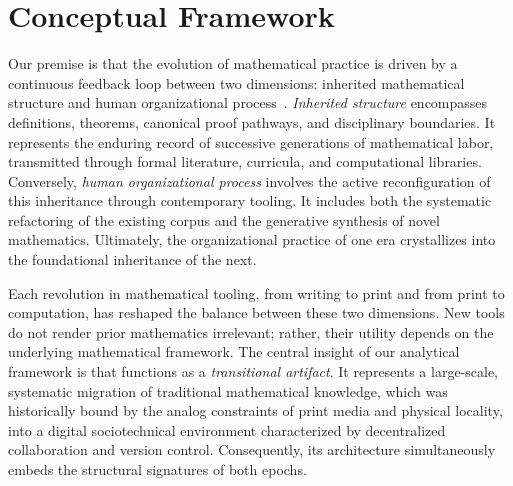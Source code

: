 \section{Conceptual Framework}
\label{sec:conceptual-framework}
Our premise is that the evolution of mathematical practice is driven by a continuous feedback loop between two dimensions: inherited mathematical structure and human organizational process~\cite{avigad2024,commelin2023}. \emph{Inherited structure} encompasses definitions, theorems, canonical proof pathways, and disciplinary boundaries. It represents the enduring record of successive generations of mathematical labor, transmitted through formal literature, curricula, and computational libraries. Conversely, \emph{human organizational process} involves the active reconfiguration of this inheritance through contemporary tooling. It includes both the systematic refactoring of the existing corpus and the generative synthesis of novel mathematics. Ultimately, the organizational practice of one era crystallizes into the foundational inheritance of the next.

Each revolution in mathematical tooling, from writing to print and from print to computation, has reshaped the balance between these two dimensions. New tools do not render prior mathematics irrelevant; rather, their utility depends on the underlying mathematical framework. The central insight of our analytical framework is that  functions as a \emph{transitional artifact}. It represents a large-scale, systematic migration of traditional mathematical knowledge, which was historically bound by the analog constraints of print media and physical locality, into a digital sociotechnical environment characterized by decentralized collaboration and version control. Consequently, its architecture simultaneously embeds the structural signatures of both epochs.

